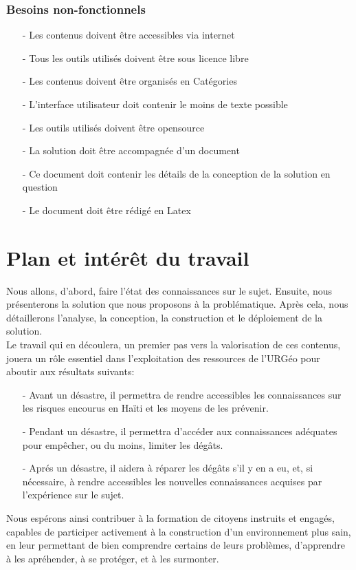 		\subsubsection*{Besoins non-fonctionnels}
			\begin{itemize}
				\item[-] Les contenus doivent \^etre accessibles via internet
				\item[-] Tous les outils utilis\'es doivent \^etre sous licence libre
				\item[-] Les contenus doivent \^etre organis\'es en Cat\'egories
				\item[-] L'interface utilisateur doit contenir le moins de texte possible
				\item[-] Les outils utilis\'es doivent \^etre opensource
				\item[-] La solution doit \^etre accompagn\'ee d'un document
				\item[-] Ce document doit contenir les d\'etails de la conception de la solution en question
				\item[-] Le document doit \^etre r\'edig\'e en Latex
			\end{itemize}



\section*{Plan et int\'er\^et du travail}
	Nous allons, d'abord, faire l'\'etat des connaissances sur le sujet. Ensuite, nous pr\'esenterons la solution que nous proposons \`a la probl\'ematique. Apr\`es  cela, nous d\'etaillerons l'analyse, la conception, la construction et le d\'eploiement de la solution.\\
	Le travail qui en d\'ecoulera, un premier pas vers la valorisation de ces contenus, jouera un r\^ole essentiel dans l'exploitation des ressources de l'URG\'eo pour aboutir aux r\'esultats suivants:

	\begin{itemize}
		\item[-] Avant un d\'esastre, il permettra de rendre accessibles les connaissances sur les risques encourus en Ha\"iti et les moyens de les pr\'evenir.
		\item[-] Pendant un d\'esastre, il permettra d'acc\'eder aux connaissances ad\'equates pour emp\^echer, ou du moins, limiter les d\'eg\^ats.
		\item[-] Apr\'es un d\'esastre, il aidera \`a r\'eparer les d\'eg\^ats s'il y en a eu, et, si n\'ecessaire, \`a rendre accessibles les nouvelles connaissances acquises par l'exp\'erience sur le sujet.\\
	\end{itemize}

	\noindent Nous esp\'erons ainsi contribuer \`a la formation de citoyens instruits et engag\'es, capables de participer activement \`a la construction d'un environnement plus sain, en leur permettant de bien comprendre certains de leurs probl\`emes, d'apprendre \`a les apr\'ehender, \`a se prot\'eger, et \`a les surmonter.


